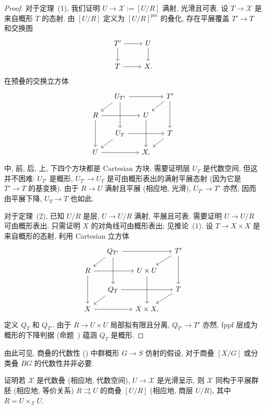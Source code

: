 \begin{proof}
对于定理~(1), 我们证明 $U\to\mathcal X:=[U/R]$ 满射, 光滑且可表. 设 $T\to\mathcal X$ 是来自概形 $T$ 的态射. 由 $[U/R]$ 定义为 $[U/R]^{\mathrm{pre}}$ 的叠化, 存在平展覆盖 $T'\to T$ 和交换图
\[
\begin{tikzcd}
T'\arrow[r]\arrow[d]&U\arrow[d]\\
T\arrow[r]&\mathcal X.
\end{tikzcd}
\]
在预叠的交换立方体
\begin{equation}\label{src:4.4.15}
\begin{tikzcd}[row sep=1.1em,column sep=1.4em]
{}&U_{T'}\arrow[rr]\arrow[dl]\arrow[dd]&{}&T'\arrow[dl]\arrow[dd]\\
R\arrow[rr]\arrow[dd]&{}&U\arrow[dd]&{}\\
{}&U_T\arrow[rr]\arrow[dl]&{}&T\arrow[dl]\\
U\arrow[rr]&{}&\mathcal X,&{}
\end{tikzcd}
\end{equation}
中, 前, 后, 上, 下四个方块都是 Cartesian 方块. 需要证明层 $U_T$ 是代数空间, 但这并不困难: $U_{T'}$ 是概形, $U_{T'}\to U_T$ 是可由概形表出的满射平展态射 (因为它是 $T'\to T$ 的基变换). 由于 $R\to U$ 满射且平展 (相应地, 光滑), $U_{T'}\to T'$ 亦然, 因而由平展下降, $U_T\to T$ 也如此.

对于定理~(2), 已知 $U/R$ 是层, $U\to U/R$ 满射, 平展且可表. 需要证明 $U\to U/R$ 可由概形表出. 只需证明 $X$ 的对角线可由概形表出; 见推论~(1). 设 $T\to X\times X$ 是来自概形的态射, 利用 Cartesian 立方体
\begin{equation}\label{src:4.4.16}
\begin{tikzcd}[row sep=1.1em,column sep=1.4em]
{}&Q_{T'}\arrow[rr]\arrow[dl]\arrow[dd]&{}&T'\arrow[dl]\arrow[dd]\\
R\arrow[rr]\arrow[dd]&{}&U\times U\arrow[dd]&{}\\
{}&Q_T\arrow[rr]\arrow[dl]&{}&T\arrow[dl]\\
X\arrow[rr]&{}&X\times X,&{}
\end{tikzcd}
\end{equation}
定义 $Q_T$ 和 $Q_{T'}$. 由于 $R\to U\times U$ 局部拟有限且分离, $Q_{T'}\to T'$ 亦然. fppf 层成为概形的下降判据 (命题~) 蕴涵 $Q_T$ 是概形.
\end{proof}
\begin{remark}[再论商叠]\label{src:4.4.17}
由此可见, 商叠的代数性 () 中群概形 $G\to S$ 仿射的假设, 对于商叠 $[X/G]$ 或分类叠 $BG$ 的代数性并非必要.
\end{remark}
\begin{exercise}[重要]\label{src:4.4.18}
证明若 $\mathcal X$ 是代数叠 (相应地, 代数空间), $U\to\mathcal X$ 是光滑呈示, 则 $\mathcal X$ 同构于平展群胚 (相应地, 等价关系) $R\rightrightarrows U$ 的商叠 $[U/R]$ (相应地, 商层 $U/R$), 其中 $R=U\times_{\mathcal X}U$.
\end{exercise}

